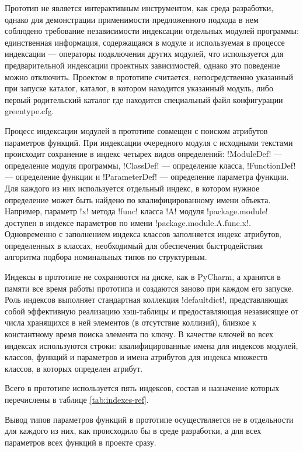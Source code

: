 Прототип не является интерактивным инструментом, как среда разработки, однако
для демонстрации применимости предложенного подхода в нем соблюдено требование
независимости индексации отдельных модулей программы: единственная информация,
содержащаяся в модуле и используемая в процессе индексации --- операторы
подключения других модулей, что используется для предварительной индексации
проектных зависимостей, однако это поведение можно отключить. Проектом в
прототипе считается, непосредственно указанный при запуске каталог, каталог, в
котором находится указанный модуль, либо первый родительский каталог где
находится специальный файл конфигурации greentype.cfg.

Процесс индексации модулей в прототипе совмещен с поиском атрибутов параметров
функций. При индексации очередного модуля с исходными текстами происходит
сохранение в индекс четырех видов определений: !ModuleDef! --- определение
модуля программы, !ClassDef! --- определение класса, !FunctionDef! ---
определение функции и !ParameterDef! --- определение параметра функции. Для
каждого из них используется отдельный индекс, в котором нужное определение может
быть найдено по квалифицированному имени объекта. Например, параметр !x! метода
!func! класса !A! модуля !package.module! доступен в индексе параметров по имени
!package.module.A.func.x!. Одновременно с заполнением индекса классов
заполняется индекс атрибутов, определенных в классах, необходимый для
обеспечения быстродействия алгоритма подбора номинальных типов по структурным.

Индексы в прототипе не сохраняются на диске, как в PyCharm, а хранятся в
памяти все время работы прототипа и создаются заново при каждом его запуске. Роль
индексов выполняет стандартная коллекция !defaultdict!, представляющая собой
эффективную реализацию хэш-таблицы и предоставляющая независящее от числа
хранящихся в ней элементов (в отсутствие коллизий), близкое к константному
время поиска элемента по ключу. В качестве ключей во всех индексах используются
строки: квалифицированные имена для индексов модулей, классов, функций и
параметров и имена атрибутов для индекса множеств классов, в которых определен
атрибут.

Всего в прототипе используется пять индексов, состав и назначение которых
перечислены в таблице \ref{tab:indexes-ref}.

Вывод типов параметров функций в прототипе осуществляется не в отдельности для
каждого из них, как происходило бы в среде разработки, а для всех параметров
всех функций в проекте сразу.


